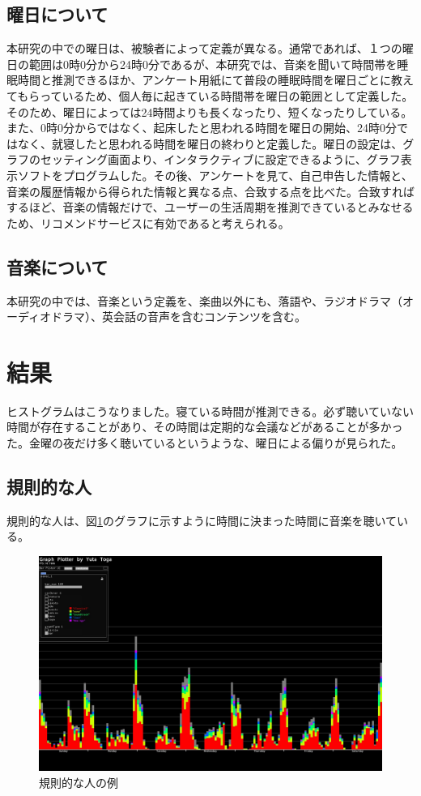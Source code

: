\documentclass{jsarticle}
\begin{document}
\subsection{曜日について}
本研究の中での曜日は、被験者によって定義が異なる。通常であれば、１つの曜日の範囲は0時0分から24時0分であるが、本研究では、音楽を聞いて時間帯を睡眠時間と推測できるほか、アンケート用紙にて普段の睡眠時間を曜日ごとに教えてもらっているため、個人毎に起きている時間帯を曜日の範囲として定義した。そのため、曜日によっては24時間よりも長くなったり、短くなったりしている。また、0時0分からではなく、起床したと思われる時間を曜日の開始、24時0分ではなく、就寝したと思われる時間を曜日の終わりと定義した。曜日の設定は、グラフのセッティング画面より、インタラクティブに設定できるように、グラフ表示ソフトをプログラムした。その後、アンケートを見て、自己申告した情報と、音楽の履歴情報から得られた情報と異なる点、合致する点を比べた。合致すればするほど、音楽の情報だけで、ユーザーの生活周期を推測できているとみなせるため、リコメンドサービスに有効であると考えられる。

\subsection{音楽について}
本研究の中では、音楽という定義を、楽曲以外にも、落語や、ラジオドラマ（オーディオドラマ）、英会話の音声を含むコンテンツを含む。

\section{結果}



ヒストグラムはこうなりました。寝ている時間が推測できる。必ず聴いていない時間が存在することがあり、その時間は定期的な会議などがあることが多かった。金曜の夜だけ多く聴いているというような、曜日による偏りが見られた。
\subsection{規則的な人}
規則的な人は、図\ref{sample_regular}のグラフに示すように時間に決まった時間に音楽を聴いている。
\begin{figure}[h]
\begin{center}
\includegraphics[width=14cm]{sample_regular.jpg}
\caption{規則的な人の例}
\label{sample_regular}
\end{center}
\end{figure}
\end{document}
